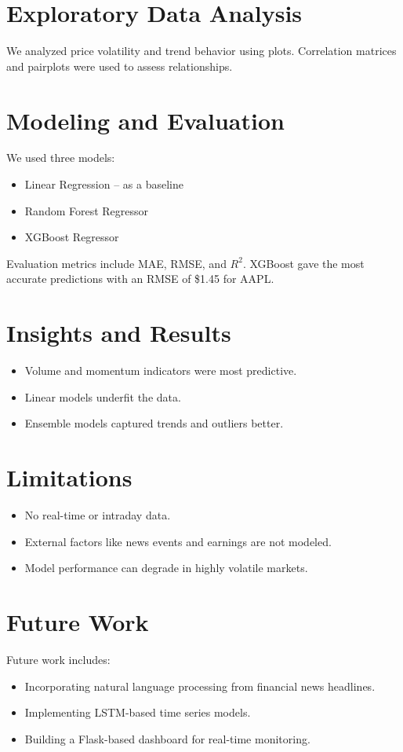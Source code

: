 \documentclass[runningheads]{llncs}
\begin{document}
\section{Exploratory Data Analysis}
We analyzed price volatility and trend behavior using plots. Correlation matrices and pairplots were used to assess relationships.

\section{Modeling and Evaluation}
We used three models:
\begin{itemize}
    \item Linear Regression – as a baseline
    \item Random Forest Regressor
    \item XGBoost Regressor
\end{itemize}
Evaluation metrics include MAE, RMSE, and $R^2$. XGBoost gave the most accurate predictions with an RMSE of \$1.45 for AAPL.

\section{Insights and Results}
\begin{itemize}
    \item Volume and momentum indicators were most predictive.
    \item Linear models underfit the data.
    \item Ensemble models captured trends and outliers better.
\end{itemize}

\section{Limitations}
\begin{itemize}
    \item No real-time or intraday data.
    \item External factors like news events and earnings are not modeled.
    \item Model performance can degrade in highly volatile markets.
\end{itemize}

\section{Future Work}
Future work includes:
\begin{itemize}
    \item Incorporating natural language processing from financial news headlines.
    \item Implementing LSTM-based time series models.
    \item Building a Flask-based dashboard for real-time monitoring.
\end{itemize}
\end{document}
